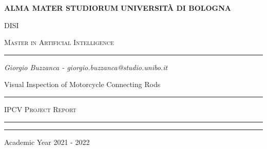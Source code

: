 \begin{titlepage}
\centering 

\bigskip

{\Large \textbf{ALMA MATER STUDIORUM}}
{\Large \textbf{UNIVERSIT\`A DI BOLOGNA}}

{\scshape
\large
DISI
}

{\scshape
\normalsize
Master in Artificial Intelligence
}

\bigskip


\hrule


\bigskip


\bigskip


\bigskip


\bigskip

{\itshape
\large
Giorgio Buzzanca - giorgio.buzzanca@studio.unibo.it
\par}


\bigskip


\bigskip


\bigskip


\bigskip

{\centering
\Large
    Visual Inspection of Motorcycle Connecting Rods
\par}


\bigskip


\bigskip


\bigskip


\bigskip


\bigskip


\bigskip


\begin{minipage}[b]{8 cm}
\hrule

\bigskip

{\centering\scshape 
IPCV Project Report
\par}


\bigskip

\hrule
\end{minipage}
\bigskip


\bigskip


\bigskip


\bigskip


\bigskip


\bigskip


\bigskip


\bigskip


\bigskip


\bigskip


\bigskip


\bigskip


\bigskip


\bigskip


\bigskip

\hrule

\bigskip

{\centering
Academic Year 2021 - 2022
\par}
\end{titlepage}
